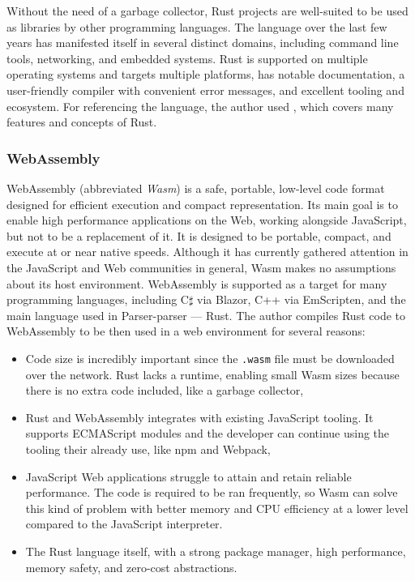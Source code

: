 \documentclass[english,engineering]{wizthesis}
\newcommand{\paraphrase}[1]{#1}
\newcommand{\thisproject}{Parser-parser}
\begin{document}
Without the need of a garbage collector, Rust projects are well-suited to be
used as libraries by other programming languages. The language over the last few
years has manifested itself in several distinct domains, including command line
tools, networking, and embedded systems. Rust is supported on multiple operating
systems and targets multiple platforms, has notable documentation, a
user-friendly compiler with convenient error messages, and excellent tooling and
ecosystem. For referencing the language, the author used \cite{klabnik-2018},
which covers many features and concepts of Rust.

\subsubsection*{WebAssembly}

WebAssembly \cite{webassembly} (abbreviated \emph{Wasm}) is a safe, portable,
low-level code format designed for efficient execution and compact
representation. Its main goal is to enable high performance applications on the
Web, working alongside JavaScript, but not to be a replacement of it.
\paraphrase{It is designed to be portable, compact, and execute at or near
native speeds. Although it has currently gathered attention in the JavaScript
and Web communities in general, Wasm makes no assumptions about its host
environment.} WebAssembly is supported as a target for many programming
languages, including C$\sharp$ via Blazor, C++ via EmScripten, and the main
language used in \thisproject{} --- Rust. The author compiles Rust code to
WebAssembly to be then used in a web environment for several reasons:
\begin{itemize}
  \item \paraphrase{Code size is incredibly important since the \texttt{.wasm}
  file must be downloaded over the network. Rust lacks a runtime, enabling small
  Wasm sizes because there is no extra code included, like a garbage collector},
  \item \paraphrase{Rust and WebAssembly integrates with existing JavaScript
  tooling. It supports ECMAScript modules and the developer can continue using
  the tooling their already use, like npm and Webpack},
  \item \paraphrase{JavaScript Web applications struggle to attain and retain
  reliable performance.} The code is required to be ran frequently, so Wasm can
  solve this kind of problem \paraphrase{with better memory and CPU efficiency
  at a lower level compared to the JavaScript interpreter}.
  \item The Rust language itself, with a strong package manager, high
  performance, memory safety, and zero-cost abstractions.
\end{itemize}
\end{document}
